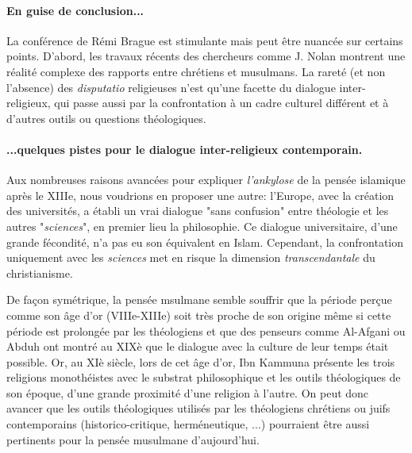  

\paragraph{En guise de conclusion...} La conférence de Rémi Brague est stimulante mais peut être nuancée sur certains points. D'abord, les travaux récents des chercheurs comme J. Nolan montrent une réalité complexe des rapports entre chrétiens et musulmans. La rareté (et non l'absence) des \textit{disputatio} religieuses n'est qu'une facette du dialogue inter-religieux, qui passe aussi par la confrontation à un cadre culturel différent et à d'autres outils ou questions théologiques. 

\paragraph{...quelques pistes pour le dialogue inter-religieux contemporain.}

Aux nombreuses raisons avancées pour expliquer \textit{l'ankylose} de la pensée islamique après le XIIIe\cite{brague_sur_2023}, nous voudrions en proposer une autre:  l'Europe, avec la création des universités, a établi un vrai dialogue "sans confusion" entre théologie et les autres "\textit{sciences}", en premier lieu la philosophie. Ce dialogue universitaire, d'une grande fécondité, n'a pas eu son équivalent en Islam. Cependant, la confrontation uniquement avec les \textit{sciences} met en risque la dimension \textit{transcendantale} du christianisme. 

De façon symétrique, la pensée msulmane semble souffrir que la période perçue comme son âge d'or (VIIIe-XIIIe) soit très proche de son origine\cite[p.84]{brague_sur_2023} même si cette période est prolongée par les théologiens \cite{CandiardTheoIslam} et que des penseurs comme Al-Afgani ou Abduh ont montré au XIXè que le dialogue avec la culture de leur temps était possible. Or, au XIè siècle, lors de cet âge d'or, Ibn Kammuna \cite{ibn_kammuna_examen_2012} présente les trois religions monothéistes avec le substrat philosophique et les outils théologiques de son époque, d'une grande proximité d'une religion à l'autre. On peut donc avancer que les outils théologiques  utilisés par les théologiens chrétiens ou juifs contemporains (historico-critique, herméneutique, ...) pourraient être aussi pertinents pour la pensée musulmane d'aujourd'hui.  




\begin{comment}
  \begin{singlequote}
    il a tendance à considérer que son apogée s'est situé à son début et que son histoire postérieure est celle d'un éloignement constant à partir de ce sommet. Il attribue à Mahomet des déclarations en ce sens comme :\textit{ «Le pire dans les choses, c'est ce qu'elles ont de nouveau» }  
\end{singlequote}  
\end{comment}

